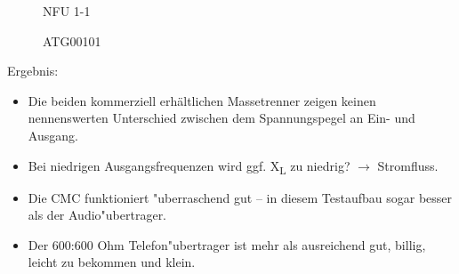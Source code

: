 \documentclass[ngerman,11pt,parskip=half] {scrartcl}
\newcommand {\tscopesize}{12cm}
\begin{document}
\begin{figure}[H]
\centering
{}
\caption{NFU 1-1} \label{fig:1}
\end{figure}

\begin{figure}[H]
\centering
{}
\caption{ATG00101} \label{fig:1}
\end{figure}

Ergebnis:
\begin{itemize}
\item Die beiden kommerziell erhältlichen Massetrenner zeigen keinen nennenswerten Unterschied zwischen dem Spannungspegel an Ein- und Ausgang.
\item Bei niedrigen Ausgangsfrequenzen wird ggf. X\textsubscript{L} zu niedrig? $\rightarrow$ Stromfluss.
\item Die CMC funktioniert "uberraschend gut -- in diesem Testaufbau sogar besser als der Audio"ubertrager.
\item Der 600:600 Ohm Telefon"ubertrager ist mehr als ausreichend gut, billig, leicht zu bekommen und klein.
\end{itemize}
\end{document}
